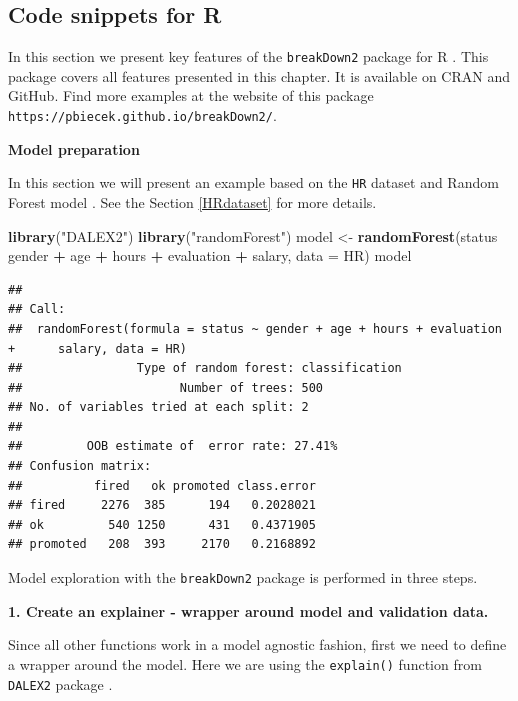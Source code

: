 \documentclass[12pt,]{krantz}
\newenvironment{Shaded}{\begin{snugshade}}{\end{snugshade}}
\newcommand{\DataTypeTok}[1]{\textcolor[rgb]{0.13,0.29,0.53}{#1}}
\newcommand{\KeywordTok}[1]{\textcolor[rgb]{0.13,0.29,0.53}{\textbf{#1}}}
\newcommand{\NormalTok}[1]{#1}
\newcommand{\OperatorTok}[1]{\textcolor[rgb]{0.81,0.36,0.00}{\textbf{#1}}}
\newcommand{\StringTok}[1]{\textcolor[rgb]{0.31,0.60,0.02}{#1}}
\theoremstyle{definition}
\theoremstyle{definition}
\theoremstyle{definition}
\theoremstyle{remark}
\begin{document}
\hypertarget{code-snippets-for-r-4}{%
\subsection{Code snippets for R}\label{code-snippets-for-r-4}}

In this section we present key features of the \texttt{breakDown2}
package for R \citep{R-breakDown}. This package covers all features
presented in this chapter. It is available on CRAN and GitHub. Find more
examples at the website of this package
\texttt{https://pbiecek.github.io/breakDown2/}.

\textbf{Model preparation}

In this section we will present an example based on the \texttt{HR}
dataset and Random Forest model \citep{R-randomForest}. See the Section
\ref{HRdataset} for more details.

\begin{Shaded}
\begin{Highlighting}[]
\KeywordTok{library}\NormalTok{(}\StringTok{"DALEX2"}\NormalTok{)}
\KeywordTok{library}\NormalTok{(}\StringTok{"randomForest"}\NormalTok{)}
\NormalTok{model <-}\StringTok{ }\KeywordTok{randomForest}\NormalTok{(status }\OperatorTok{~}\StringTok{ }\NormalTok{gender }\OperatorTok{+}\StringTok{ }\NormalTok{age }\OperatorTok{+}\StringTok{ }\NormalTok{hours }\OperatorTok{+}\StringTok{ }\NormalTok{evaluation }\OperatorTok{+}\StringTok{ }\NormalTok{salary, }\DataTypeTok{data =}\NormalTok{ HR)}
\NormalTok{model}
\end{Highlighting}
\end{Shaded}

\begin{verbatim}
## 
## Call:
##  randomForest(formula = status ~ gender + age + hours + evaluation +      salary, data = HR) 
##                Type of random forest: classification
##                      Number of trees: 500
## No. of variables tried at each split: 2
## 
##         OOB estimate of  error rate: 27.41%
## Confusion matrix:
##          fired   ok promoted class.error
## fired     2276  385      194   0.2028021
## ok         540 1250      431   0.4371905
## promoted   208  393     2170   0.2168892
\end{verbatim}

Model exploration with the \texttt{breakDown2} package is performed in
three steps.

\textbf{1. Create an explainer - wrapper around model and validation
data.}

Since all other functions work in a model agnostic fashion, first we
need to define a wrapper around the model. Here we are using the
\texttt{explain()} function from \texttt{DALEX2} package
\citep{R-DALEX}.
\end{document}
